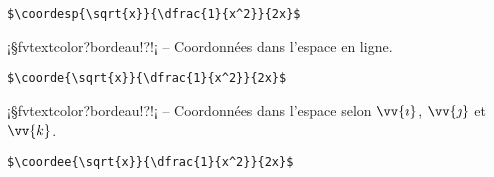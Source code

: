 \documentclass[11pt,a4paper,rgb]{report}
\begin{document}
\setlength{\leftskip}{.75cm}%
\setlength{\textwidth}{17.25cm}%

\colorbox{blue!15}{}
\hfill
\begin{minipage}{.65\textwidth}
	\begin{lstlisting}[linewidth=\textwidth, language={[LaTeX]TeX}]
	$\coordesp{\sqrt{x}}{\dfrac{1}{x^2}}{2x}$
	\end{lstlisting}
\end{minipage}

\setlength{\leftskip}{0pt}
\setlength{\textwidth}{18cm}%


\vspace*{.75cm}

\inCodeStub¡§fvtextcolor?bordeau!?!¡ -- Coordonnées dans l'espace en ligne.

\setlength{\leftskip}{.75cm}%
\setlength{\textwidth}{17.25cm}%

\colorbox{blue!15}{}
\hfill
\begin{minipage}{.65\textwidth}
	\begin{lstlisting}[linewidth=\textwidth, language={[LaTeX]TeX}]
	$\coorde{\sqrt{x}}{\dfrac{1}{x^2}}{2x}$
	\end{lstlisting}
\end{minipage}

\setlength{\leftskip}{0pt}
\setlength{\textwidth}{18cm}%


\vspace*{.75cm}

\inCodeStub¡§fvtextcolor?bordeau!?!¡ -- Coordonnées dans l'espace selon $\vv{\imath}$, $\vv{\jmath}$ et $\vv{k}$.

\setlength{\leftskip}{.75cm}%
\setlength{\textwidth}{17.25cm}%

\colorbox{blue!15}{}
\hfill
\begin{minipage}{.65\textwidth}
	\begin{lstlisting}[linewidth=\textwidth, language={[LaTeX]TeX}]
	$\coordee{\sqrt{x}}{\dfrac{1}{x^2}}{2x}$
	\end{lstlisting}
\end{minipage}

\setlength{\leftskip}{0pt}
\setlength{\textwidth}{18cm}%
\end{document}
